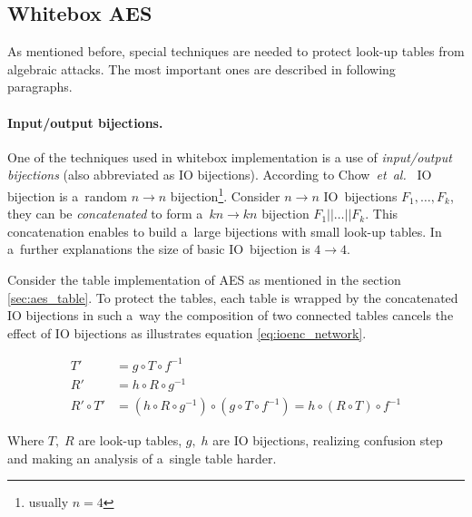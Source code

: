 \documentclass[11pt,oneside,final]{fithesis2}
\newcommand{\eal}{\emph{et~al.}}
\begin{document}
    \subsection{Whitebox AES}\label{sec:whitebox_aes_scheme_chow}
    As mentioned before, special techniques are needed to protect look-up tables from algebraic attacks. The most important ones 
    are described in following paragraphs.
    
    \paragraph*{Input/output bijections.}
    One of the techniques used in whitebox implementation is a use of \emph{input/output bijections} (also abbreviated as IO bijections).
    According to Chow~\eal~\citep{Chow02white-boxcryptography} IO bijection is a~random $n\rightarrow n$ bijection\footnote{usually $n=4$}. 
    Consider $n\rightarrow n$ IO~bijections $F_1,\dots,F_k$, they can be \emph{concatenated} to form a~$kn \rightarrow kn$ bijection 
    $F_1||\dots || F_k$. This concatenation enables to build a~large bijections with small look-up tables. In a~further explanations the size of basic 
    IO~bijection is $4 \rightarrow 4$.
    
    Consider the table implementation of AES as mentioned in the section \ref{sec:aes_table}. To protect the tables, each table is wrapped by
    the concatenated IO bijections in such a~way the composition of two connected tables cancels the effect of IO bijections as illustrates  
    equation \ref{eq:ioenc_network}.
    
    \begin{subequations}\label{eq:ioenc_network}
    \begin{align}
        T' &= g \circ T \circ f^{-1} \\
        R' &= h \circ R \circ g^{-1} \\
        R' \circ T' &= \left(h \circ R \circ g^{-1}\right) \circ \left(g \circ T \circ f^{-1}\right) = h \circ (R \circ T) \circ f^{-1}
    \end{align}
    \end{subequations}
    
    Where $T,\; R$ are look-up tables, $g,\; h$ are IO bijections, realizing confusion step and making an analysis of a~single table harder.
    
\end{document}
